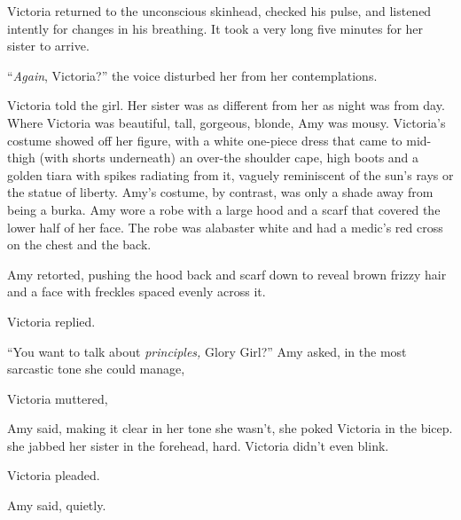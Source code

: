 
Victoria returned to the unconscious skinhead, checked his pulse, and listened intently for changes in his breathing. It took a very long five minutes for her sister to arrive.

“{\em Again}, Victoria?” the voice disturbed her from her contemplations.

 Victoria told the girl. Her sister was as different from her as night was from day. Where Victoria was beautiful, tall, gorgeous, blonde, Amy was mousy. Victoria's costume showed off her figure, with a white one-piece dress that came to mid-thigh (with shorts underneath) an over-the shoulder cape, high boots and a golden tiara with spikes radiating from it, vaguely reminiscent of the sun's rays or the statue of liberty. Amy's costume, by contrast, was only a shade away from being a burka. Amy wore a robe with a large hood and a scarf that covered the lower half of her face. The robe was alabaster white and had a medic's red cross on the chest and the back.

 Amy retorted, pushing the hood back and scarf down to reveal brown frizzy hair and a face with freckles spaced evenly across it.

 Victoria replied.

“You want to talk about {\em principles,} Glory Girl?” Amy asked, in the most sarcastic tone she could manage, 

 Victoria muttered, 

 Amy said, making it clear in her tone she wasn't,  she poked Victoria in the bicep.  she jabbed her sister in the forehead, hard. Victoria didn't even blink.

 Victoria pleaded.

 Amy said, quietly.

